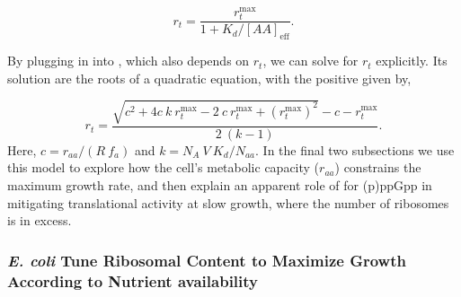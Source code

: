 \begin{equation}
r_t = \frac{r_{t}^{\text{max}}}{1 + K_d/[AA]_{\text{eff}}}.
\label{eq:rt_kd_simple}
\end{equation}

By plugging in  into , which also depends on $r_t$, we
can solve for $r_t$ explicitly. Its solution are the roots of a quadratic equation,
with the positive given by,

\begin{equation}
r_t = \frac{\sqrt{c^2 + 4 c \ k \ r_{t}^{\text{max}} - 2 \ c \ r_{t}^{\text{max}} + (r_{t}^{\text{max}})^2} - c - r_{t}^{\text{max}}}{2 \ (k-1)}.
\label{eq:rt_final}
\end{equation}
Here, $c = r_{aa}/(R \ f_a)$ and $k = N_A \ V \ K_d / N_{aa}$. In the final two
subsections we use this model to explore how the cell's metabolic capacity
($r_{aa}$) constrains the maximum growth rate, and then explain an apparent role
of for (p)ppGpp in mitigating translational activity at slow growth, where the
number of ribosomes is in excess.

\subsubsection{\textit{E. coli} Tune Ribosomal Content to
Maximize Growth According to Nutrient availability}



